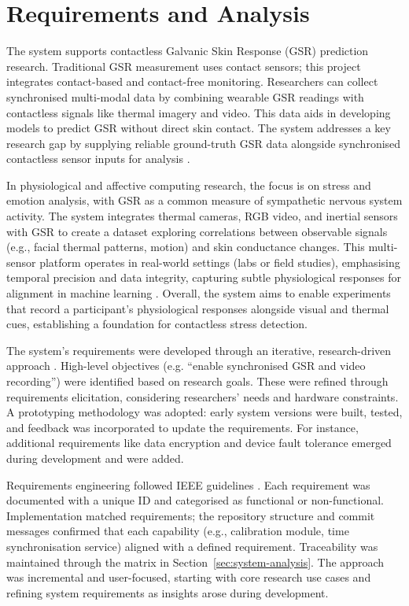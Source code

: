 \chapter{Requirements and Analysis}

The system supports contactless Galvanic Skin Response (GSR) prediction research. Traditional GSR measurement uses contact sensors; this project integrates contact-based and contact-free monitoring. Researchers can collect synchronised multi-modal data by combining wearable GSR readings with contactless signals like thermal imagery and video. This data aids in developing models to predict GSR without direct skin contact. The system addresses a key research gap by supplying reliable ground-truth GSR data alongside synchronised contactless sensor inputs for analysis \cite{ref1}.

In physiological and affective computing research, the focus is on stress and emotion analysis, with GSR as a common measure of sympathetic nervous system activity. The system integrates thermal cameras, RGB video, and inertial sensors with GSR to create a dataset exploring correlations between observable signals (e.g., facial thermal patterns, motion) and skin conductance changes. This multi-sensor platform operates in real-world settings (labs or field studies), emphasising temporal precision and data integrity, capturing subtle physiological responses for alignment in machine learning \cite{ref1}. Overall, the system aims to enable experiments that record a participant's physiological responses alongside visual and thermal cues, establishing a foundation for contactless stress detection.

The system's requirements were developed through an iterative, research-driven approach \cite{ref12}. High-level objectives (e.g. ``enable synchronised GSR and video recording'') were identified based on research goals. These were refined through requirements elicitation, considering researchers' needs and hardware constraints. A prototyping methodology was adopted: early system versions were built, tested, and feedback was incorporated to update the requirements. For instance, additional requirements like data encryption and device fault tolerance emerged during development and were added.

Requirements engineering followed IEEE guidelines \cite{ref11}. Each requirement was documented with a unique ID and categorised as functional or non-functional. Implementation matched requirements; the repository structure and commit messages confirmed that each capability (e.g., calibration module, time synchronisation service) aligned with a defined requirement. Traceability was maintained through the matrix in Section~\ref{sec:system-analysis}. The approach was incremental and user-focused, starting with core research use cases and refining system requirements as insights arose during development.


